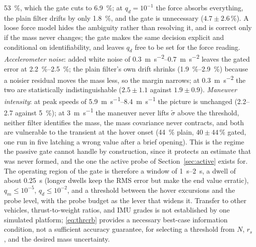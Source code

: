 \documentclass{ieeeaccess}
\begin{document}
\SI{53}{\percent}, which the gate cuts to \SI{6.9}{\percent}; at $q_d=10^{-1}$
the force absorbs everything, the plain filter drifts by only
\SI{1.8}{\percent}, and the gate is unnecessary ($4.7\pm2.6$\,\si{\percent}). A
loose force model hides the ambiguity rather than resolving it, and is correct
only if the mass never changes; the gate makes the same decision explicit and
conditional on identifiability, and leaves $q_d$ free to be set for the force
reading. \emph{Accelerometer noise}: added white noise of
\SIrange{0.3}{0.7}{\meter\per\square\second} leaves the gated error at
\SIrange{2.2}{2.5}{\percent}; the plain filter's own drift shrinks
(\SIrange{1.9}{2.9}{\percent}) because a noisier residual moves the mass less,
so the margin narrows; at \SI{0.3}{\meter\per\square\second} the two are
statistically indistinguishable ($2.5\pm1.1$ against $1.9\pm0.9$). \emph{Maneuver intensity}: at peak speeds of
\SIrange{5.9}{8.4}{\meter\per\second} the picture is unchanged
(\SIrange{2.2}{2.7}{} against \SI{5}{\percent}); at \SI{3}{\meter\per\second}
the maneuver never lifts $\tilde\sigma$ above the threshold, neither filter
identifies the mass, the mass covariance never contracts, and both are
vulnerable to the transient at the hover onset (\SI{44}{\percent} plain,
$40\pm44$\,\si{\percent} gated, one run in five latching a wrong value after a
brief opening). This is the regime the passive gate cannot handle by
construction, since it protects an estimate that was never formed, and the one
the active probe of Section~\ref{sec:active} exists for. The operating region of
the gate is therefore a window of \SIrange{1}{2}{\second}, a dwell of about
\SI{0.25}{\second} (longer dwells keep the RMS error but make the end value
erratic), $q_m\le10^{-5}$, $q_d\le10^{-2}$, and a threshold between the hover
excursions and the probe level, with the probe budget as the lever that widens
it. Transfer to other vehicles, thrust-to-weight ratios, and IMU grades is not
established by one simulated platform; \eqref{eq:thrcrb} provides a necessary
best-case information condition, not a sufficient accuracy guarantee, for
selecting a threshold from $N$, $r_s$, and the desired mass uncertainty.
\end{document}
